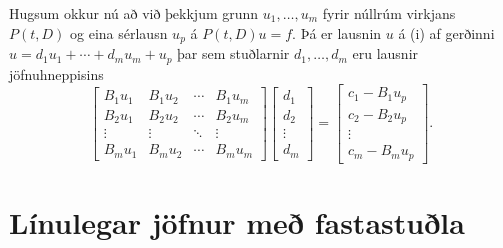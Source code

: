 Hugsum okkur nú að við þekkjum grunn $u_1,\dots,u_m$ fyrir núllrúm
virkjans $P(t,D)$ og eina sérlausn $u_p$  á $P(t,D)u=f$.  Þá er lausnin $u$
á  (i) af gerðinni $u=d_1u_1+\cdots+d_mu_m+u_p$ þar sem stuðlarnir 
$d_1,\dots,d_m$ eru lausnir jöfnuhneppisins
\begin{equation*}
\left[\begin{matrix} B_1u_1 & B_1u_2 & \cdots & B_1u_m\\
B_2u_1 & B_2u_2 & \cdots & B_2u_m\\
\vdots & \vdots &\ddots & \vdots \\
B_mu_1 & B_mu_2 & \cdots & B_mu_m
\end{matrix}\right]
\left[\begin{matrix} d_1\\ d_2\\ \vdots \\ d_m\end{matrix}\right]
=\left[\begin{matrix} c_1-B_1u_p\\ c_2-B_2u_p\\ \vdots \\ c_m-B_mu_p
\end{matrix}\right].
\label{2.1.10}
\end{equation*}


\section{Línulegar jöfnur með fastastuðla}

